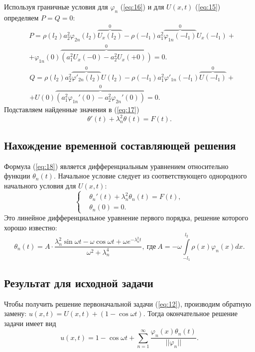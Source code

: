 \documentclass[12pt, a4paper, draft]{article}
\begin{document}
Используя граничные условия для $\varphi_n$ (\ref{eq:16}) и для $U(x,t)$ (\ref{eq:15}) определяем $P=Q=0$:
\begin{equation}
  \begin{aligned}
  & P = \rho(l_2) a_2^2 \varphi_{2n}(l_2) \overbrace{U_x(l_2)}^0 - \rho(-l_1) a_1^2 \overbrace{\varphi_{1n}(-l_1)}^0 U_x(-l_1) + \\
  & + \varphi_{1n}(0)\overbrace{(a_1^2 U_x(-0) - a_2^2 U_x(+0))}^0 = 0.
\end{aligned}
\end{equation}
\begin{equation}
  \begin{aligned}
    & Q = \rho(l_2) a_2^2 \overbrace{\varphi'_{2n}(l_2)}^0 U(l_2) - \rho(-l_1) a_1^2 \varphi'_{1n}(-l_1) \overbrace{U(-l_1)}^0 + \\
    & + U(0)\overbrace{(a_1^2 \varphi_{1n}'(0) - a_2^2 \varphi_{2n}'(0))}^0 = 0.
\end{aligned}
\end{equation}
Подставляем найденные значения в (\ref{eq:17})
\begin{equation}
\theta'(t) + \lambda_n^2 \theta(t) = F(t).
\label{eq:18}
\end{equation}
\subsection{Нахождение временной составляющей решения}
Формула (\ref{eq:18}) является дифференциальным уравнением относительно функции $\theta_n(t)$. Начальное условие следует из соответствующего однородного начального условия для $U(x,t)$:
\begin{equation}
  \left\{  
  \begin{aligned}
    & \theta_n'(t) + \lambda_n^2 \theta_n(t) = F(t), \\
    & \theta_n (0) = 0.
  \end{aligned}
  \right.
\end{equation}
Это линейное дифференциальное уравнение первого порядка, решение которого хорошо известно:
\begin{equation}
  \theta_n(t) = A\cdot\frac{\lambda_n^2 \sin \omega t - \omega \cos \omega t + \omega e^{-\lambda_n^2 t}}{\omega^2 + \lambda_n^4},\ \text{где}\ A=-\omega\int\limits_{-l_1}^{l_2}\rho(x)\varphi_n(x)dx.
\end{equation}
\subsection{Результат для исходной задачи}
Чтобы получить решение первоначальной задачи (\ref{eq:12}), производим обратную замену: $u(x,t) = U(x,t) + (1 - \cos \omega t)$. Тогда окончательное решение задачи имеет вид
\begin{equation}
  u(x,t)= 1 - \cos \omega t + \sum \limits_{n=1}^{\infty} \frac{\varphi_n(x) \theta_n(t)}{||\varphi_n||}.
\end{equation}
\end{document}
